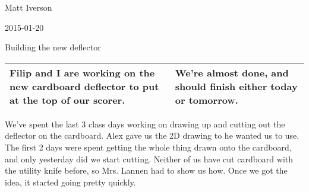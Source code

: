 Matt Iverson

2015-01-20

Building the new deflector

\begin{tabular}{|p{5cm}|p{5cm}|}
 \hline
 Filip and I are working on the new cardboard deflector to put at the top of our scorer.
&
 We're almost done, and should finish either today or tomorrow.
\\
 \hline
\end{tabular}

We've spent the last 3 class days working on drawing up and cutting out the deflector on the cardboard. Alex gave us the 2D drawing to he wanted us to use. The first 2 days were spent getting the whole thing drawn onto the cardboard, and only yesterday did we start cutting. Neither of us have cut cardboard with the utility knife before, so Mrs. Lannen had to show us how. Once we got the idea, it started going pretty quickly.
